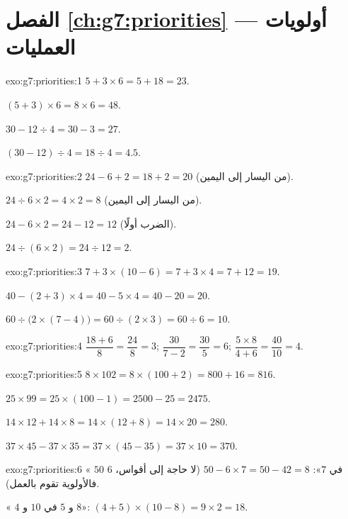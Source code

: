 \section*{الفصل \ref{ch:g7:priorities} --- أولويات العمليات}

\begin{solution}{exo:g7:priorities:1}
$5 + 3 \times 6 = 5 + 18 = 23$.

$(5 + 3) \times 6 = 8 \times 6 = 48$.

$30 - 12 \div 4 = 30 - 3 = 27$.

$(30 - 12) \div 4 = 18 \div 4 = 4.5$.
\end{solution}

\begin{solution}{exo:g7:priorities:2}
$24 - 6 + 2 = 18 + 2 = 20$ (من اليسار إلى اليمين).

$24 \div 6 \times 2 = 4 \times 2 = 8$ (من اليسار إلى اليمين).

$24 - 6 \times 2 = 24 - 12 = 12$ (الضرب أولًا).

$24 \div (6 \times 2) = 24 \div 12 = 2$.
\end{solution}

\begin{solution}{exo:g7:priorities:3}
$7 + 3 \times (10 - 6) = 7 + 3 \times 4 = 7 + 12 = 19$.

$40 - (2 + 3) \times 4 = 40 - 5 \times 4 = 40 - 20 = 20$.

$60 \div \bigl(2 \times (7 - 4)\bigr) = 60 \div (2 \times 3)
= 60 \div 6 = 10$.
\end{solution}

\begin{solution}{exo:g7:priorities:4}
$\dfrac{18 + 6}{8} = \dfrac{24}{8} = 3$; \quad
$\dfrac{30}{7 - 2} = \dfrac{30}{5} = 6$; \quad
$\dfrac{5 \times 8}{4 + 6} = \dfrac{40}{10} = 4$.
\end{solution}

\begin{solution}{exo:g7:priorities:5}
$8 \times 102 = 8 \times (100 + 2) = 800 + 16 = 816$.

$25 \times 99 = 25 \times (100 - 1) = 2500 - 25 = 2475$.

$14 \times 12 + 14 \times 8 = 14 \times (12 + 8) = 14 \times 20 = 280$.

$37 \times 45 - 37 \times 35 = 37 \times (45 - 35) = 37 \times 10 =
370$.
\end{solution}

\begin{solution}{exo:g7:priorities:6}
« $50$  $6$ في $7$»:
$50 - 6 \times 7 = 50 - 42 = 8$ (لا حاجة إلى أقواس، فالأولوية
تقوم بالعمل).

«  $4$ و $5$ في  $10$ و
$8$»: $(4 + 5) \times (10 - 8) = 9 \times 2 = 18$.
\end{solution}

